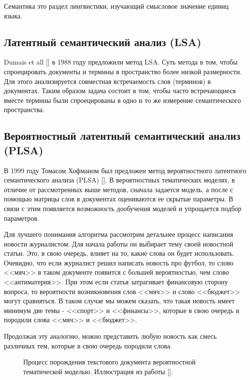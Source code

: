 Семантика это раздел лингвистики, изучающий смысловое значение единиц языка.

\subsection{Латентный семантический анализ (LSA)}

Dumais et all [\todo{}] в 1988 году предложили метод LSA. Суть метода в том, чтобы спроецировать документы и термины в пространство более низкой размерности. Для этого анализируется совместная встречаемость слов (терминов) в документах. Таким образом задача состоит в том, чтобы часто встречающиеся вместе термины были спроецированы в одно и то же измерение семантического пространства.

\subsection{Вероятностный латентный семантический анализ (PLSA)}

В 1999 году Томасом Хофманом был предложен метод вероятностного латентного семантического анализа (PLSA) [\todo{}]. В вероятностных тематических моделях, в отличие от рассмотренных выше методов, сначала задается модель, а после с помощью матрицы слов в документах оцениваются ее скрытые параметры. В связи с этим появляется возможность дообучения моделей и упрощается подбор параметров.

Для лучшего понимания алгоритма рассмотрим детальнее процесс написания новости журналистом. Для начала работы он выбирает тему своей новостной статьи. Это, в свою очередь, влияет на то, какие слова он будет использовать. Очевидно, что если журналист решил написать новость про футбол, то слово <<мяч>> в таком документе появится с большей вероятностью, чем слово <<антиматерия>>. При этом если статья затрагивает финансовую сторону вопроса, то вероятности возникновения слов <<мяч>> и слово <<бюджет>> могут сравняться. В таком случае мы можем сказать,  что такая новость имеет минимум две темы - <<спорт>> и <<финансы>>, которые в свою очередь и породили слова <<мяч>> и <<бюджет>>. 

Продолжая эту аналогию, можно представить любую новость как смесь различных тем, которые в свою очередь породили слова. 

\begin{figure}[h]
\caption{Процесс порождения текстового документа вероятностной тематической моделью. Иллюстрация из работы [].}
\label{fig:image}
\end{figure}
\todo{}


